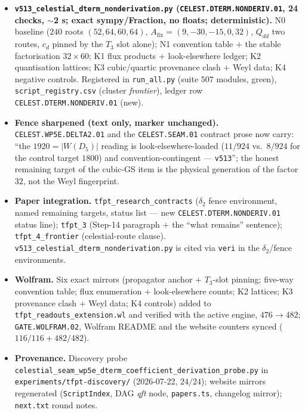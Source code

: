 \documentclass[11pt]{article}
\begin{document}
\begin{itemize}[leftmargin=1.5em]
\item \textbf{\texttt{v513\_celestial\_dterm\_nonderivation.py} (\texttt{CELEST.DTERM.NONDERIV.01},
24 checks, $\sim$2 s; exact sympy/Fraction, no floats; deterministic).} N0 baseline ($240$ roots
$(52,64,60,64)$, $A_{\mathrm{fix}}=(9,-30,-15,0,32)$, $Q_{dd}$ two routes, $c_d$ pinned by the
$T_3$ slot alone); N1 convention table $+$ the stable factorisation $32\times60$; K1 flux products
$+$ look-elsewhere ledger; K2 quantisation lattices; K3 cubic/quartic provenance clash $+$ Weyl
data; K4 negative controls. Registered in \texttt{run\_all.py} (suite $507$ modules, green),
\texttt{script\_registry.csv} (cluster \emph{frontier}), ledger row
\texttt{CELEST.DTERM.NONDERIV.01} (new).
\item \textbf{Fence sharpened (text only, marker unchanged).} \texttt{CELEST.WP5E.DELTA2.01} and
the \texttt{CELEST.SEAM.01} contract prose now carry: ``the $1920=|W(D_5)|$ reading is
look-elsewhere-loaded ($11/924$ vs.\ $8/924$ for the control target $1800$) and
convention-contingent --- \texttt{v513}''; the honest remaining target of the cubic-GS item is the
physical generation of the factor $32$, not the Weyl fingerprint.
\item \textbf{Paper integration.} \texttt{tfpt\_research\_contracts} ($\delta_2$ fence environment,
named remaining targets, status list --- new \texttt{CELEST.DTERM.NONDERIV.01} status line);
\texttt{tfpt\_3} (Step-14 paragraph $+$ the ``what remains'' sentence); \texttt{tfpt\_4\_frontier}
(celestial-route clause). \texttt{v513\_celestial\_dterm\_nonderivation.py} is cited via
\texttt{veri} in the $\delta_2$/fence environments.
\item \textbf{Wolfram.} Six exact mirrors (propagator anchor $+$ $T_3$-slot pinning; five-way
convention table; flux enumeration $+$ look-elsewhere counts; K2 lattices; K3 provenance clash $+$
Weyl data; K4 controls) added to \texttt{tfpt\_readouts\_extension.wl} and verified with the
active engine, $476\to482$; \texttt{GATE.WOLFRAM.02}, Wolfram README and the website counters
synced ($116/116+482/482$).
\item \textbf{Provenance.} Discovery probe
\texttt{celestial\_seam\_}\allowbreak\texttt{wp5e\_dterm\_}\allowbreak\texttt{coefficient\_}\allowbreak\texttt{derivation\_probe.py}
in \texttt{experiments/tfpt-discovery/}
(2026-07-22, $24/24$); website mirrors regenerated (\texttt{ScriptIndex}, DAG \emph{qft} node,
\texttt{papers.ts}, changelog mirror); \texttt{next.txt} round notes.
\end{itemize}
\end{document}

